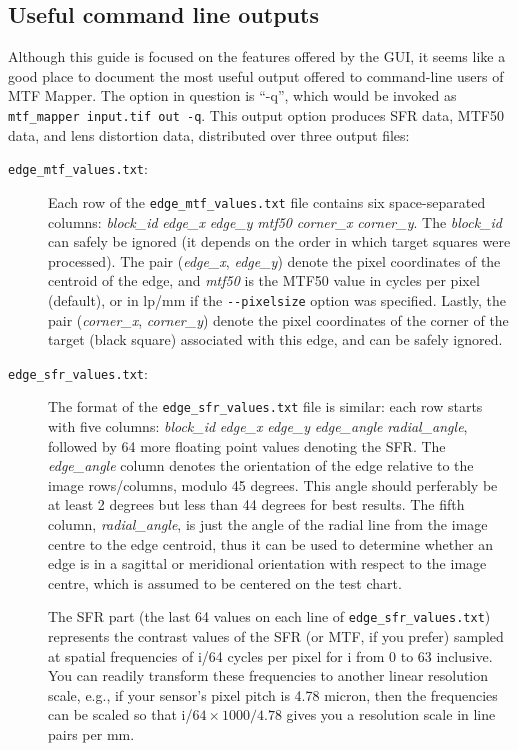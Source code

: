 \documentclass[a4paper]{article}
\begin{document}
\subsection{Useful command line outputs}
Although this guide is focused on the features offered by the GUI, it seems
like a good place to document the most useful output offered to command-line
users of MTF Mapper. The option in question is ``-q'', which would be
invoked as \verb+mtf_mapper input.tif out -q+. This output option produces
SFR data, MTF50 data, and lens distortion data, distributed over three
output files:
\begin{description}
\item[\texttt{edge\_mtf\_values.txt}:]
Each row of the \texttt{edge\_mtf\_values.txt} file contains six space-separated columns:
\emph{block\_id} \emph{edge\_x} \emph{edge\_y} \emph{mtf50} \emph{corner\_x}
\emph{corner\_y}. The \emph{block\_id} can safely
be ignored (it depends on the order in which target squares were processed).
The pair (\emph{edge\_x}, \emph{edge\_y}) denote the pixel coordinates of the centroid
of the edge, and \emph{mtf50} is the MTF50 value in cycles per pixel (default),
or in lp/mm if the \verb+--pixelsize+ option was specified. Lastly, the pair
(\emph{corner\_x}, \emph{corner\_y}) denote the pixel coordinates of the corner of the
target (black square) associated with this edge, and can be safely ignored.

\item[\texttt{edge\_sfr\_values.txt}:]
The format of the \texttt{edge\_sfr\_values.txt} file is similar: each row starts with
five columns: \emph{block\_id} \emph{edge\_x} \emph{edge\_y}
\emph{edge\_angle} \emph{radial\_angle}, followed by 64 more floating point values denoting the SFR. 
The \emph{edge\_angle}
column denotes the orientation of the edge relative to the image
rows/columns, modulo 45 degrees. This angle should perferably be at least 2
degrees but less than 44 degrees for best results. The fifth column,
\emph{radial\_angle}, is just the angle of the radial line from the image centre
to the edge centroid, thus it can be used to determine whether an edge is in
a sagittal or meridional orientation with respect to the image centre, which
is assumed to be centered on the test chart.

The SFR part (the last 64 values on each line of
\texttt{edge\_sfr\_values.txt}) represents the contrast values of the SFR (or MTF, if you prefer) sampled at
spatial frequencies of i/64 cycles per pixel for i from 0 to 63 inclusive.
You can readily transform these frequencies to another linear resolution
scale, e.g., if your sensor's pixel pitch is 4.78 micron, then the
frequencies can be scaled so that i/$64\times1000/4.78$ gives you a resolution
scale in line pairs per mm.



\end{description}
\end{document}

